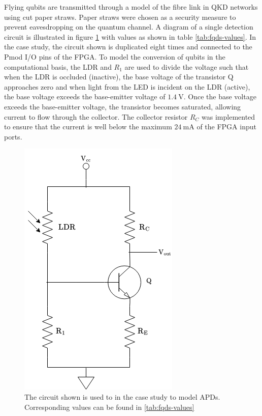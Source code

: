 Flying qubits are transmitted through a model of the fibre link in QKD networks using cut paper straws. Paper straws were chosen as a security measure to prevent eavesdropping on the quantum channel. A diagram of a single detection circuit is illustrated in figure \ref{fig:fqds-circuit} with values as shown in table \ref{tab:fqds-values}. In the case study, the circuit shown is duplicated eight times and connected to the Pmod I/O pins of the FPGA. To model the conversion of qubits in the computational basis, the LDR and $R_1$ are used to divide the voltage such that when the LDR is occluded (inactive), the base voltage of the transistor Q approaches zero and when light from the LED is incident on the LDR (active), the base voltage exceeds the base-emitter voltage of $\SI{1.4}{\volt}$. Once the base voltage exceeds the base-emitter voltage, the transistor becomes saturated, allowing current to flow through the collector. The collector resistor $R_C$ was implemented to ensure that the current is well below the maximum $\SI{24}{\milli\ampere}$ of the FPGA input ports.
\begin{figure}[!ht]
	\centering
	\includegraphics[width=0.45\linewidth]{body/ch5/figs/fqds-circuit}
	\caption[Simple Circuit Diagram for Modelling Avalanche Photodiode Detectors in a QKD network.]{The circuit shown is used to in the case study to model APDs. Corresponding values can be found in \ref{tab:fqds-values}}
	\label{fig:fqds-circuit}
\end{figure}

